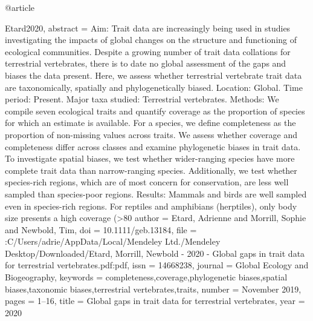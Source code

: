 

@article{Etard2020,
abstract = {Aim: Trait data are increasingly being used in studies investigating the impacts of global changes on the structure and functioning of ecological communities. Despite a growing number of trait data collations for terrestrial vertebrates, there is to date no global assessment of the gaps and biases the data present. Here, we assess whether terrestrial vertebrate trait data are taxonomically, spatially and phylogenetically biased. Location: Global. Time period: Present. Major taxa studied: Terrestrial vertebrates. Methods: We compile seven ecological traits and quantify coverage as the proportion of species for which an estimate is available. For a species, we define completeness as the proportion of non-missing values across traits. We assess whether coverage and completeness differ across classes and examine phylogenetic biases in trait data. To investigate spatial biases, we test whether wider-ranging species have more complete trait data than narrow-ranging species. Additionally, we test whether species-rich regions, which are of most concern for conservation, are less well sampled than species-poor regions. Results: Mammals and birds are well sampled even in species-rich regions. For reptiles and amphibians (herptiles), only body size presents a high coverage (>80%
author = {Etard, Adrienne and Morrill, Sophie and Newbold, Tim},
doi = {10.1111/geb.13184},
file = {:C\:/Users/adrie/AppData/Local/Mendeley Ltd./Mendeley Desktop/Downloaded/Etard, Morrill, Newbold - 2020 - Global gaps in trait data for terrestrial vertebrates.pdf:pdf},
issn = {14668238},
journal = {Global Ecology and Biogeography},
keywords = {completeness,coverage,phylogenetic biases,spatial biases,taxonomic biases,terrestrial vertebrates,traits},
number = {November 2019},
pages = {1--16},
title = {{Global gaps in trait data for terrestrial vertebrates}},
year = {2020}
}

}
